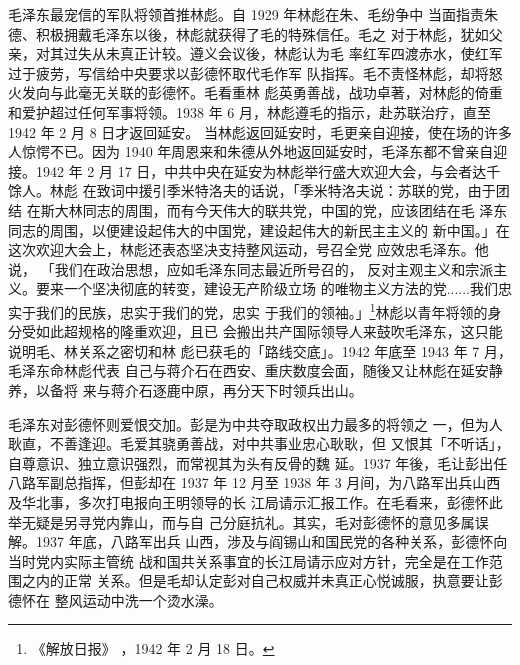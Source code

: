 毛泽东最宠信的军队将领首推林彪。自 1929 年林彪在朱、毛纷争中
当面指责朱德、积极拥戴毛泽东以後，林彪就获得了毛的特殊信任。毛之
对于林彪，犹如父亲，对其过失从未真正计较。遵义会议後，林彪认为毛
率红军四渡赤水，使红军过于疲劳，写信给中央要求以彭德怀取代毛作军
队指挥。毛不责怪林彪，却将怒火发向与此毫无关联的彭德怀。毛看重林
彪英勇善战，战功卓著，对林彪的倚重和爱护超过任何军事将领。1938 年
6 月，林彪遵毛的指示，赴苏联治疗，直至 1942 年 2 月 8 日才返回延安。
当林彪返回延安时，毛更亲自迎接，使在场的许多人惊愕不已。因为 1940
年周恩来和朱德从外地返回延安时，毛泽东都不曾亲自迎接。1942 年 2 月
17 日，中共中央在延安为林彪举行盛大欢迎大会，与会者达千馀人。林彪
在致词中援引季米特洛夫的话说，「季米特洛夫说：苏联的党，由于团结
在斯大林同志的周围，而有今天伟大的联共党，中国的党，应该团结在毛
泽东同志的周围，以便建设起伟大的中国党，建设起伟大的新民主主义的
新中国。」在这次欢迎大会上，林彪还表态坚决支持整风运动，号召全党
应效忠毛泽东。他说，
「我们在政治思想，应如毛泽东同志最近所号召的，
反对主观主义和宗派主义。要来一个坚决彻底的转变，建设无产阶级立场
的唯物主义方法的党......我们忠实于我们的民族，忠实于我们的党，忠实
于我们的领袖。」\footnote{《解放日报》
，1942 年 2 月 18 日。
}林彪以青年将领的身分受如此超规格的隆重欢迎，且已
会搬出共产国际领导人来鼓吹毛泽东，这只能说明毛、林关系之密切和林
彪已获毛的「路线交底」。1942 年底至 1943 年 7 月，毛泽东命林彪代表
自己与蒋介石在西安、重庆数度会面，随後又让林彪在延安静养，以备将
来与蒋介石逐鹿中原，再分天下时领兵出山。

毛泽东对彭德怀则爱恨交加。彭是为中共夺取政权出力最多的将领之
一，但为人耿直，不善逢迎。毛爱其骁勇善战，对中共事业忠心耿耿，但
又恨其「不听话」，自尊意识、独立意识强烈，而常视其为头有反骨的魏
延。1937 年後，毛让彭出任八路军副总指挥，但彭却在 1937 年 12 月至
1938 年 3 月间，为八路军出兵山西及华北事，多次打电报向王明领导的长
江局请示汇报工作。在毛看来，彭德怀此举无疑是另寻党内靠山，而与自
己分庭抗礼。其实，毛对彭德怀的意见多属误解。1937 年底，八路军出兵
山西，涉及与阎锡山和国民党的各种关系，彭德怀向当时党内实际主管统
战和国共关系事宜的长江局请示应对方针，完全是在工作范围之内的正常
关系。但是毛却认定彭对自己权威并未真正心悦诚服，执意要让彭德怀在
整风运动中洗一个烫水澡。

